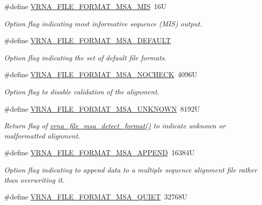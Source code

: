 \begin{DoxyCompactItemize}
\#define \mbox{\hyperlink{group__file__utils_ga494488a771aa0c602fb4cf445be34d47}{V\+R\+N\+A\+\_\+\+F\+I\+L\+E\+\_\+\+F\+O\+R\+M\+A\+T\+\_\+\+M\+S\+A\+\_\+\+M\+IS}}~16U
\begin{DoxyCompactList}\small\item\em Option flag indicating most informative sequence (M\+IS) output. \end{DoxyCompactList}\item 
\#define \mbox{\hyperlink{group__file__utils_ga4acc255373831856a8417b68de8a94c0}{V\+R\+N\+A\+\_\+\+F\+I\+L\+E\+\_\+\+F\+O\+R\+M\+A\+T\+\_\+\+M\+S\+A\+\_\+\+D\+E\+F\+A\+U\+LT}}
\begin{DoxyCompactList}\small\item\em Option flag indicating the set of default file formats. \end{DoxyCompactList}\item 
\#define \mbox{\hyperlink{group__file__utils_ga229fb3778ecabea4782902b69fa48fd1}{V\+R\+N\+A\+\_\+\+F\+I\+L\+E\+\_\+\+F\+O\+R\+M\+A\+T\+\_\+\+M\+S\+A\+\_\+\+N\+O\+C\+H\+E\+CK}}~4096U
\begin{DoxyCompactList}\small\item\em Option flag to disable validation of the alignment. \end{DoxyCompactList}\item 
\#define \mbox{\hyperlink{group__file__utils_gabdc948f547e550125de3e7c65878400c}{V\+R\+N\+A\+\_\+\+F\+I\+L\+E\+\_\+\+F\+O\+R\+M\+A\+T\+\_\+\+M\+S\+A\+\_\+\+U\+N\+K\+N\+O\+WN}}~8192U
\begin{DoxyCompactList}\small\item\em Return flag of \mbox{\hyperlink{group__file__utils_ga627ac281b5f11c63861726e6472626c9}{vrna\+\_\+file\+\_\+msa\+\_\+detect\+\_\+format()}} to indicate unknown or malformatted alignment. \end{DoxyCompactList}\item 
\#define \mbox{\hyperlink{group__file__utils_ga1577ea0f497d9c501549c863a4f2c089}{V\+R\+N\+A\+\_\+\+F\+I\+L\+E\+\_\+\+F\+O\+R\+M\+A\+T\+\_\+\+M\+S\+A\+\_\+\+A\+P\+P\+E\+ND}}~16384U
\begin{DoxyCompactList}\small\item\em Option flag indicating to append data to a multiple sequence alignment file rather than overwriting it. \end{DoxyCompactList}\item 
\#define \mbox{\hyperlink{group__file__utils_ga73aa3701a22c5acfcb2e8927287a0554}{V\+R\+N\+A\+\_\+\+F\+I\+L\+E\+\_\+\+F\+O\+R\+M\+A\+T\+\_\+\+M\+S\+A\+\_\+\+Q\+U\+I\+ET}}~32768U

\end{DoxyCompactItemize}
